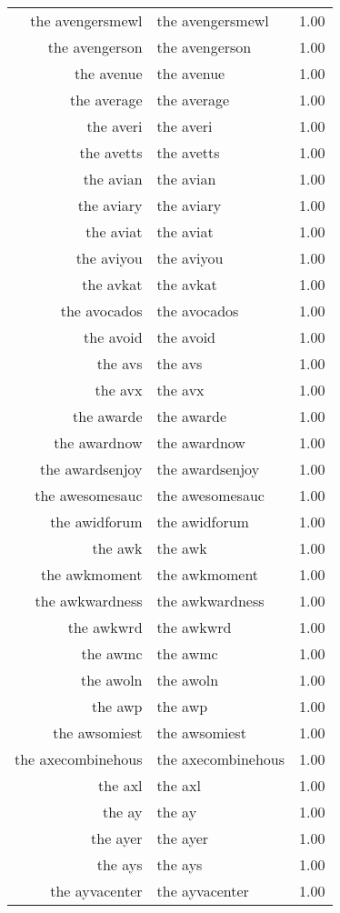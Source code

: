 \begin{table}[ht]
\begin{tabular}{rlr}
  the avengersmewl & the avengersmewl & 1.00 \\ 
  the avengerson & the avengerson & 1.00 \\ 
  the avenue & the avenue & 1.00 \\ 
  the average & the average & 1.00 \\ 
  the averi & the averi & 1.00 \\ 
  the avetts & the avetts & 1.00 \\ 
  the avian & the avian & 1.00 \\ 
  the aviary & the aviary & 1.00 \\ 
  the aviat & the aviat & 1.00 \\ 
  the aviyou & the aviyou & 1.00 \\ 
  the avkat & the avkat & 1.00 \\ 
  the avocados & the avocados & 1.00 \\ 
  the avoid & the avoid & 1.00 \\ 
  the avs & the avs & 1.00 \\ 
  the avx & the avx & 1.00 \\ 
  the awarde & the awarde & 1.00 \\ 
  the awardnow & the awardnow & 1.00 \\ 
  the awardsenjoy & the awardsenjoy & 1.00 \\ 
  the awesomesauc & the awesomesauc & 1.00 \\ 
  the awidforum & the awidforum & 1.00 \\ 
  the awk & the awk & 1.00 \\ 
  the awkmoment & the awkmoment & 1.00 \\ 
  the awkwardness & the awkwardness & 1.00 \\ 
  the awkwrd & the awkwrd & 1.00 \\ 
  the awmc & the awmc & 1.00 \\ 
  the awoln & the awoln & 1.00 \\ 
  the awp & the awp & 1.00 \\ 
  the awsomiest & the awsomiest & 1.00 \\ 
  the axecombinehous & the axecombinehous & 1.00 \\ 
  the axl & the axl & 1.00 \\ 
  the ay & the ay & 1.00 \\ 
  the ayer & the ayer & 1.00 \\ 
  the ays & the ays & 1.00 \\ 
  the ayvacenter & the ayvacenter & 1.00 \\ 

\end{tabular}
\end{table}
